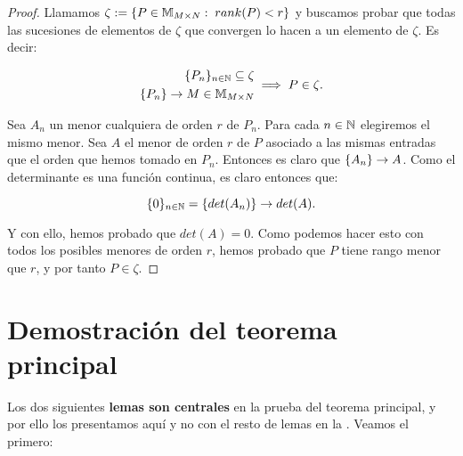 \begin{proof}
    Llamamos $\zeta := \{ P \in \mathbb{M}_{M \times N}: \; rank(P) < r \}$ y buscamos probar que todas las sucesiones de elementos de $\zeta$ que convergen lo hacen a un elemento de $\zeta$. Es decir:

    \begin{equation}
        \begin{split}
            \{ P_n \}_{n \in \mathbb{N}} \subseteq \zeta \\
            \{ P_n \} \to M \in \mathbb{M}_{M \times N} \\
        \end{split}
        \implies P \in \zeta.
    \end{equation}

    Sea $A_n$ un menor cualquiera de orden $r$ de $P_n$. Para cada $n \in \mathbb{N}$ elegiremos el mismo menor. Sea $A$ el menor de orden $r$ de $P$ asociado a las mismas entradas que el orden que hemos tomado en $P_n$. Entonces es claro que $\{ A_n \} \to A$. Como el determinante es una función continua, es claro entonces que:

    \begin{equation}
        \{ 0 \}_{n \in \mathbb{N}} = \{ det(A_n) \} \to det(A).
    \end{equation}

    Y con ello, hemos probado que $det(A) = 0$. Como podemos hacer esto con todos los posibles menores de orden $r$, hemos probado que $P$ tiene rango menor que $r$, y por tanto $P \in \zeta$.
\end{proof}

\section{Demostración del teorema principal}

Los dos siguientes \textbf{lemas son centrales} en la prueba del teorema principal, y por ello los presentamos aquí y no con el resto de lemas en la  . Veamos el primero:

